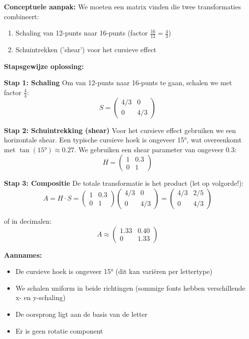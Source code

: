 \documentclass{ximera}
\begin{document}
\begin{freeResponse}
\textbf{Conceptuele aanpak:} We moeten een matrix vinden die twee transformaties combineert:
\begin{enumerate}
\item Schaling van 12-punts naar 16-punts (factor $\frac{16}{12} = \frac{4}{3}$)
\item Schuintrekken ('shear') voor het cursieve effect
\end{enumerate}

\textbf{Stapsgewijze oplossing:}

\textbf{Stap 1: Schaling}
Om van 12-punts naar 16-punts te gaan, schalen we met factor $\frac{4}{3}$:
$$S = \begin{pmatrix} 4/3 & 0 \\ 0 & 4/3 \end{pmatrix}$$

\textbf{Stap 2: Schuintrekking (shear)}
Voor het cursieve effect gebruiken we een horizontale shear. Een typische cursieve hoek is ongeveer 15°, wat overeenkomt met $\tan(15°) \approx 0.27$. We gebruiken een shear parameter van ongeveer $0.3$:
$$H = \begin{pmatrix} 1 & 0.3 \\ 0 & 1 \end{pmatrix}$$

\textbf{Stap 3: Compositie}
De totale transformatie is het product (let op volgorde!):
$$A = H \cdot S = \begin{pmatrix} 1 & 0.3 \\ 0 & 1 \end{pmatrix} \begin{pmatrix} 4/3 & 0 \\ 0 & 4/3 \end{pmatrix} = \begin{pmatrix} 4/3 & 2/5 \\ 0 & 4/3 \end{pmatrix}$$

of in decimalen:
$$A \approx \begin{pmatrix} 1.33 & 0.40 \\ 0 & 1.33 \end{pmatrix}$$

\textbf{Aannames:}
\begin{itemize}
\item De cursieve hoek is ongeveer 15° (dit kan variëren per lettertype)
\item We schalen uniform in beide richtingen (sommige fonts hebben verschillende x- en y-schaling)
\item De oorsprong ligt aan de basis van de letter
\item Er is geen rotatie component
\end{itemize}


\end{freeResponse}
\end{document}
